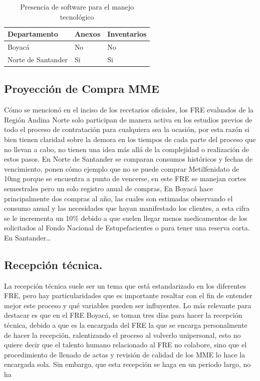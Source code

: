 \documentclass[
]{book}
\begin{document}
\begin{longtable}[t]{lll}
\caption{\label{tab:softwareTecnologia}Presencia de software para el manejo tecnológico}\\
\toprule
Departamento & Anexos & Inventarios\\
\midrule
Boyacá & No & No\\
Norte de Santander & Si & Si\\
\bottomrule
\end{longtable}

\hypertarget{proyecciuxf3n-de-compra-mme}{%
\subsection{Proyección de Compra MME}\label{proyecciuxf3n-de-compra-mme}}

Cómo se mencionó en el inciso de los recetarios oficiales, los FRE evaluados de la Región Andina Norte solo participan de manera activa en los estudios previos de todo el proceso de contratación para cualquiera sea la ocasión, por esta razón si bien tienen claridad sobre la demora en los tiempos de cada parte del proceso que no llevan a cabo, no tienen una idea más allá de la complejidad o realización de estos pasos. En Norte de Santander se comparan consumos históricos y fechas de vencimiento, ponen cómo ejemplo que no se puede comprar Metilfenidato de 10mg porque se encuentra a punto de vencerse, en este FRE se manejan cortes semestrales pero un solo registro anual de compras, En Boyacá hace principalmente dos compras al año, las cuales son estimadas observando el consumo anual y las necesidades que hayan manifestado los clientes, a esta cifra se le incrementa un 10\% debido a que suelen llegar menos medicamentos de los solicitados al Fondo Nacional de Estupefacientes o para tener una reserva corta. En Santander\ldots{}

\hypertarget{recepciuxf3n-tuxe9cnica.}{%
\subsection{Recepción técnica.}\label{recepciuxf3n-tuxe9cnica.}}

La recepción técnica suele ser un tema que está estandarizado en los diferentes FRE, pero hay particularidades que es importante resaltar con el fin de entender mejor este proceso y qué variables pueden ser influyentes. Lo más relevante para destacar es que en el FRE Boyacá, se toman tres días para hacer la recepción técnica, debido a que es la encargada del FRE la que se encarga personalmente de hacer la recepción, ralentizando el proceso al volverlo unipersonal, esto no quiere decir que el talento humano relacionado al FRE no colabore, sino que el procedimiento de llenado de actas y revisión de calidad de los MME lo hace la encargada sola. Sin embargo, que esta recepción se haga en un periodo largo, no ha
\end{document}
